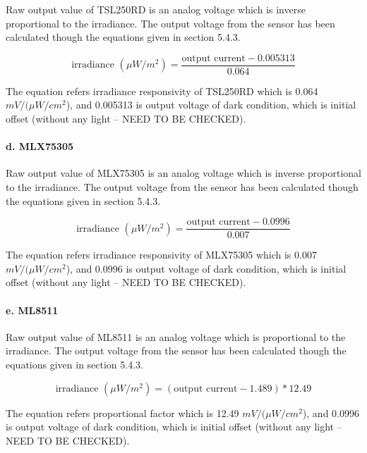 Raw output value of TSL250RD is an analog voltage which is inverse proportional to the irradiance. The output voltage from the sensor has been calculated though the equations given in section 5.4.3.

{\centering
 \[ \text{irradiance } (\mu W/m^2) = \frac{\text{output current} - 0.005313}{0.064} \]
 \par
 }
 
 \bigbreak
 The equation refers irradiance responsivity of TSL250RD which is 0.064 \(mV/(\mu W/cm^2\)), and 0.005313 is output voltage of dark condition, which is initial offset (without any light -- NEED TO BE CHECKED).

\paragraph{d. MLX75305}

Raw output value of MLX75305 is an analog voltage which is inverse proportional to the irradiance. The output voltage from the sensor has been calculated though the equations given in section 5.4.3.

{\centering
 \[ \text{irradiance } (\mu W/m^2) = \frac{\text{output current} - 0.0996}{0.007} \]
 \par
 }
 
 \bigbreak
 The equation refers irradiance responsivity of MLX75305 which is 0.007 \(mV/(\mu W/cm^2\)), and 0.0996 is output voltage of dark condition, which is initial offset (without any light -- NEED TO BE CHECKED).

\paragraph{e. ML8511}

Raw output value of ML8511 is an analog voltage which is proportional to the irradiance. The output voltage from the sensor has been calculated though the equations given in section 5.4.3.

{\centering
 \[ \text{irradiance } (\mu W/m^2) = (\text{output current} - 1.489) * 12.49 \]
 \par
 }
 
 \bigbreak
 The equation refers proportional factor which is 12.49 \(mV/(\mu W/cm^2\)), and 0.0996 is output voltage of dark condition, which is initial offset (without any light -- NEED TO BE CHECKED).


